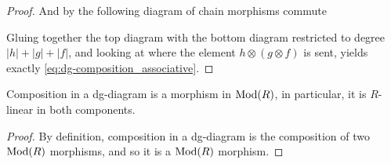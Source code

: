 \begin{proof}
    And by \cite[Definition 6.2.1]{Borceux_1994} the following diagram of chain morphisms commute
    \begin{center}
    \end{center}
    Gluing together the top diagram with the bottom diagram restricted to degree \( |h| + |g| + |f| \), and looking at where the element \( h \otimes (g \otimes f) \) is sent, yields exactly \autoref{eq:dg-composition_associative}.
\end{proof}

\begin{lemma}
    Composition in a dg-diagram is a morphism in \( \operatorname{Mod}(R) \), in particular, it is \( R \)-linear in both components.
\end{lemma}
\begin{proof}
    By definition, composition in a dg-diagram is the composition of two \( \operatorname{Mod}(R) \) morphisms, and so it is a \( \operatorname{Mod}(R) \) morphism.
\end{proof}

